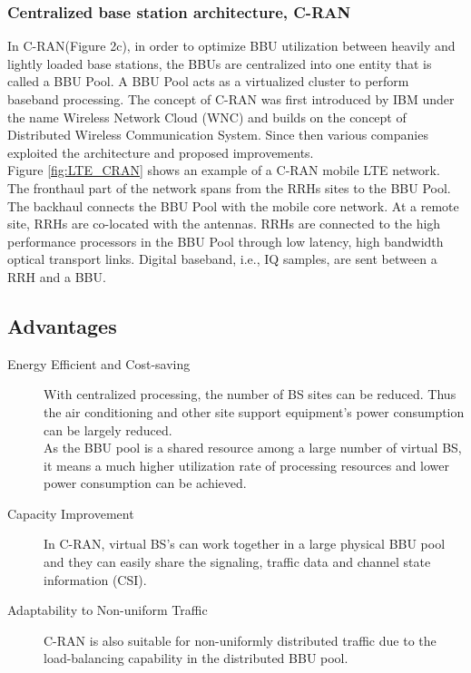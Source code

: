 \documentclass{article}
\begin{document}


\subsubsection{Centralized base station architecture, C-RAN} 

In C-RAN(Figure 2c), in order to optimize BBU utilization between
heavily and lightly loaded base stations, the BBUs are 
centralized into one entity that is called a BBU Pool.
A BBU Pool acts as a virtualized cluster to perform baseband 
processing. The concept of C-RAN was first introduced by IBM
under the name Wireless Network Cloud (WNC) and builds
on the concept of Distributed Wireless Communication System.
Since then various companies exploited the architecture and 
proposed improvements.\\


Figure \ref{fig:LTE_CRAN} shows an example of a C-RAN mobile LTE
network. The fronthaul part of the network spans from the
RRHs sites to the BBU Pool. The backhaul connects the BBU
Pool with the mobile core network. At a remote site, RRHs are
co-located with the antennas. RRHs are connected to the high
performance processors in the BBU Pool through low latency,
high bandwidth optical transport links. Digital baseband, i.e.,
IQ samples, are sent between a RRH and a BBU.\nocite{checko14}




\subsection{Advantages}\nocite{cmri11}

\begin{description}
    
    \item [Energy Efficient and Cost-saving] With centralized 
    processing, the number of BS sites can be reduced. Thus 
    the air conditioning and other site support equipment's 
    power consumption can be largely reduced.\\ 
    As the BBU pool is a shared resource among a large number
    of virtual BS, it means a much higher utilization rate of
    processing resources and lower power consumption can be
    achieved.
    
    \item [Capacity Improvement] In C-RAN, virtual BS's can work
    together in a large physical BBU pool and they can easily 
    share the signaling, traffic data and channel state 
    information (CSI). 
    
    \item [Adaptability to Non-uniform Traffic] C-RAN is also
    suitable for non-uniformly distributed traffic due to the 
    load-balancing capability in the distributed BBU pool.
    
\end{description}
\end{document}
